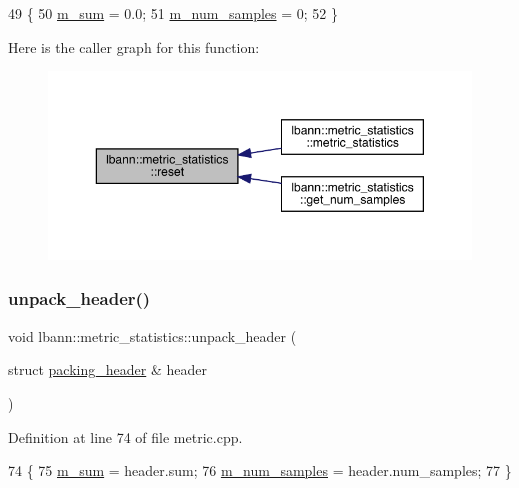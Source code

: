 \begin{DoxyCode}
49                               \{
50   \hyperlink{structlbann_1_1metric__statistics_a3481b2bb165e12a52db847f40a70f800}{m\_sum} = 0.0;
51   \hyperlink{structlbann_1_1metric__statistics_a6633bf91863b7e2327563ac93a9783f7}{m\_num\_samples} = 0;
52 \}
\end{DoxyCode}
Here is the caller graph for this function\+:\nopagebreak
\begin{figure}[H]
\begin{center}
\leavevmode
\includegraphics[width=350pt]{structlbann_1_1metric__statistics_a3ab2a4cd36c154e495bc8f18c4295907_icgraph}
\end{center}
\end{figure}
\mbox{\label{structlbann_1_1metric__statistics_acdc0ca1af87e9cbd615c6e77b9dba21c}} 
\subsubsection{\texorpdfstring{unpack\+\_\+header()}{unpack\_header()}}
{\footnotesize\ttfamily void lbann\+::metric\+\_\+statistics\+::unpack\+\_\+header (\begin{DoxyParamCaption}\item[{struct \hyperlink{structlbann_1_1metric__statistics_1_1packing__header}{packing\+\_\+header} \&}]{header }\end{DoxyParamCaption})}



Definition at line 74 of file metric.\+cpp.


\begin{DoxyCode}
74                                                                    \{
75   \hyperlink{structlbann_1_1metric__statistics_a3481b2bb165e12a52db847f40a70f800}{m\_sum} = header.sum;
76   \hyperlink{structlbann_1_1metric__statistics_a6633bf91863b7e2327563ac93a9783f7}{m\_num\_samples} = header.num\_samples;
77 \}
\end{DoxyCode}
\mbox{\label{structlbann_1_1metric__statistics_a4ff472c5d9155fe28c5a576c49f1e154}} 

